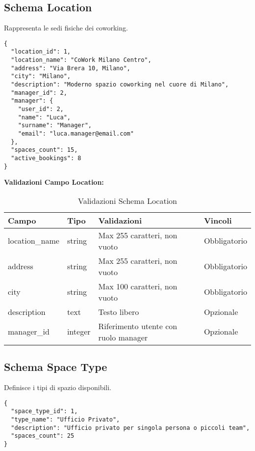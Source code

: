 \newpage

\subsection{Schema Location}
Rappresenta le sedi fisiche dei coworking.

\begin{lstlisting}[caption=Schema Location]
{
  "location_id": 1,
  "location_name": "CoWork Milano Centro",
  "address": "Via Brera 10, Milano",
  "city": "Milano",
  "description": "Moderno spazio coworking nel cuore di Milano",
  "manager_id": 2,
  "manager": {
    "user_id": 2,
    "name": "Luca",
    "surname": "Manager",
    "email": "luca.manager@email.com"
  },
  "spaces_count": 15,
  "active_bookings": 8
}
\end{lstlisting}

\textbf{Validazioni Campo Location:}
\begin{table}[H]
\centering
\scriptsize
\begin{tabular}{@{}lp{3cm}p{6cm}p{3cm}@{}}
\toprule
\textbf{Campo} & \textbf{Tipo} & \textbf{Validazioni} & \textbf{Vincoli} \\
\midrule
location\_name & string & Max 255 caratteri, non vuoto & Obbligatorio \\
address & string & Max 255 caratteri, non vuoto & Obbligatorio \\
city & string & Max 100 caratteri, non vuoto & Obbligatorio \\
description & text & Testo libero & Opzionale \\
manager\_id & integer & Riferimento utente con ruolo manager & Opzionale \\
\bottomrule
\end{tabular}
\caption{Validazioni Schema Location}
\end{table}

\subsection{Schema Space Type}
Definisce i tipi di spazio disponibili.

\begin{lstlisting}[caption=Schema Space Type]
{
  "space_type_id": 1,
  "type_name": "Ufficio Privato",
  "description": "Ufficio privato per singola persona o piccoli team",
  "spaces_count": 25
}
\end{lstlisting}

\newpage

